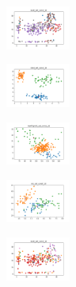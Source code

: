 \begin{figure}[H]
    \hfill
    \begin{subfigure}
        \centering
        \includegraphics[width=0.234\textwidth]{img/copkm2/ecoli_set_const_10_589741062_clust.png}
    \end{subfigure}
    \hfill
    \begin{subfigure}
        \centering
        \includegraphics[width=0.234\textwidth]{img/copkm2/rand_set_const_10_589741062_clust.png}
    \end{subfigure}
    \hfill
    \begin{subfigure}
        \centering
        \includegraphics[width=0.234\textwidth]{img/copkm2/newthyroid_set_const_10_589741062_clust.png}
    \end{subfigure}
    \hfill
    \begin{subfigure}
        \centering
        \includegraphics[width=0.234\textwidth]{img/copkm2/iris_set_const_10_277451237_clust.png}
    \end{subfigure}
    \hfill
    \begin{subfigure}
        \centering
        \includegraphics[width=0.234\textwidth]{img/copkm2/ecoli_set_const_10_277451237_clust.png}
    \end{subfigure}
    \hfill
    \begin{subfigure}

\end{subfigure}
\end{figure}
